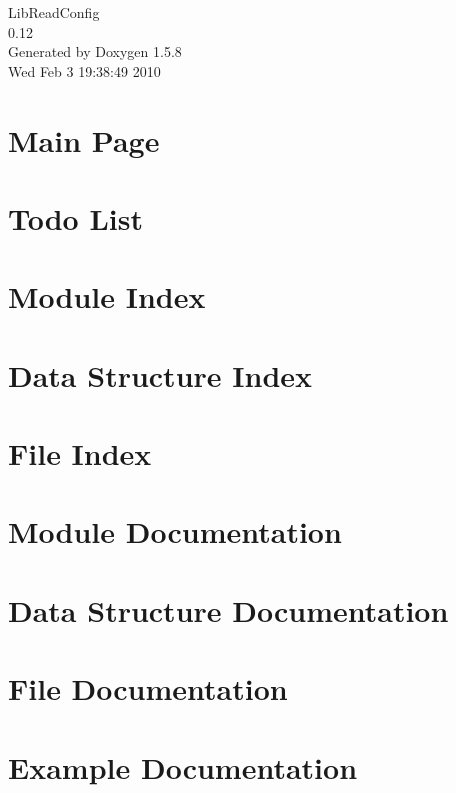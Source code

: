 \documentclass[a4paper]{article}
\begin{document}
\begin{titlepage}
\vspace*{7cm}
\begin{center}
{\Large LibReadConfig \\[1ex]\large 0.12 }\\
\vspace*{1cm}
{\large Generated by Doxygen 1.5.8}\\
\vspace*{0.5cm}
{\small Wed Feb 3 19:38:49 2010}\\
\end{center}
\end{titlepage}
\tableofcontents
{}
\section{Main Page}
\label{index}\hypertarget{index}{}
\section{Todo List}
\label{todo}
\hypertarget{todo}{}

\section{Module Index}

\section{Data Structure Index}

\section{File Index}

\section{Module Documentation}




\section{Data Structure Documentation}



\section{File Documentation}



\section{Example Documentation}



\printindex
\end{document}
